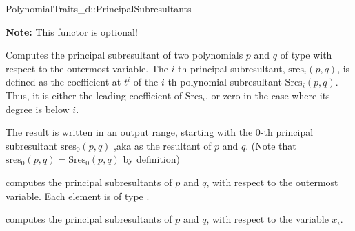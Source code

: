 \begin{ccRefConcept}{PolynomialTraits_d::PrincipalSubresultants}

\textbf{Note:} This functor is optional!

\ccDefinition

Computes the principal subresultant of two polynomials $p$ and $q$ of 
type  
with respect to the outermost variable.
The $i$-th principal subresultant, $\mathrm{sres}_i(p,q)$,
is defined as the coefficient at $t^i$ of the $i$-th polynomial
subresultant $\mathrm{Sres}_i(p,q)$. Thus, it is either the leading
coefficient of $\mathrm{Sres}_i$, or zero in the case where its degree is 
below $i$.

The result is written in an output range, starting with the $0$-th 
principal subresultant $\mathrm{sres}_0(p,q)$
,aka as the resultant of $p$ and $q$.
(Note that $\mathrm{sres}_0(p,q)=\mathrm{Sres}_0(p,q)$ by definition)


\ccOperations
{}
         { computes the principal subresultants of $p$ and $q$, 
           with respect to the outermost variable. Each element is of type
           .}

         { computes the principal subresultants of $p$ and $q$, 
           with respect to the variable $x_i$.}


\ccSeeAlso

\\
\\
\\
\\
\\

\end{ccRefConcept}
